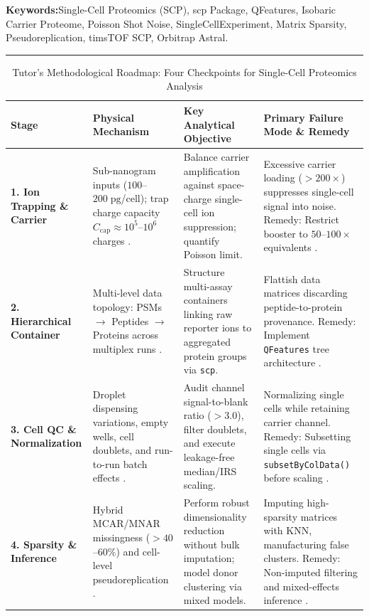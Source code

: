 \documentclass[11pt,twoside,openright]{book}
\begin{document}
\noindent
\textbf{Keywords:}\enspace Single-Cell Proteomics (SCP), scp Package, QFeatures, Isobaric Carrier Proteome, Poisson Shot Noise, SingleCellExperiment, Matrix Sparsity, Pseudoreplication, timsTOF SCP, Orbitrap Astral.

\vspace{0.8em}
\noindent\rule{\textwidth}{0.4pt}


\begin{table}[ht]
\centering
\caption{Tutor's Methodological Roadmap: Four Checkpoints for Single-Cell Proteomics Analysis}
\label{tab:scp_roadmap}
\small
\begin{tabularx}{\textwidth}{l p{3.8cm} p{4.2cm} X}
\toprule
\textbf{Stage} & \textbf{Physical Mechanism} & \textbf{Key Analytical Objective} & \textbf{Primary Failure Mode \& Remedy} \\
\midrule
\textbf{1. Ion Trapping \& Carrier} & Sub-nanogram inputs ($100$--$200\;\text{pg}$/cell); trap charge capacity $C_{\text{cap}} \approx 10^5$--$10^6$ charges \cite{slavov2021scope2, cheung2021carrier}. & Balance carrier amplification against space-charge single-cell ion suppression; quantify Poisson limit. & Excessive carrier loading ($>200\times$) suppresses single-cell signal into noise. Remedy: Restrict booster to $50$--$100\times$ equivalents \cite{vanderaa2021scp}. \\
\addlinespace
\textbf{2. Hierarchical Container} & Multi-level data topology: PSMs $\to$ Peptides $\to$ Proteins across multiplex runs \cite{gatto2023qfeatures, vanderaa2023scppackage}. & Structure multi-assay containers linking raw reporter ions to aggregated protein groups via \texttt{scp}. & Flattish data matrices discarding peptide-to-protein provenance. Remedy: Implement \texttt{QFeatures} tree architecture \cite{vanderaa2024using}. \\
\addlinespace
\textbf{3. Cell QC \& Normalization} & Droplet dispensing variations, empty wells, cell doublets, and run-to-run batch effects \cite{woo2022high, gebreyesus2022streamlined}. & Audit channel signal-to-blank ratio ($>3.0$), filter doublets, and execute leakage-free median/IRS scaling. & Normalizing single cells while retaining carrier channel. Remedy: Subsetting single cells via \texttt{subsetByColData()} before scaling \cite{petelski2021multiplexed}. \\
\addlinespace
\textbf{4. Sparsity \& Inference} & Hybrid MCAR/MNAR missingness ($>40$--$60\%$) and cell-level pseudoreplication \cite{amenta2022pseudoreplication, brunner2022ultra}. & Perform robust dimensionality reduction without bulk imputation; model donor clustering via mixed models. & Imputing high-sparsity matrices with KNN, manufacturing false clusters. Remedy: Non-imputed filtering and mixed-effects inference \cite{choi2014msstats}. \\
\bottomrule
\end{tabularx}
\end{table}
\end{document}
